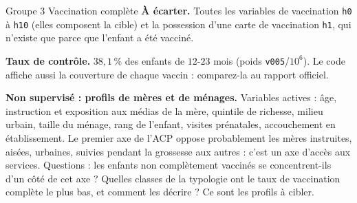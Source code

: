 \documentclass[11pt]{article}
\begin{document}
\begin{fiche}{Groupe 3 \textendash{} Vaccination complète}
\textbf{À écarter.} Toutes les variables de vaccination \texttt{h0} à \texttt{h10} (elles composent la cible) et la possession d'une carte de vaccination \texttt{h1}, qui n'existe que parce que l'enfant a été vacciné.

\textbf{Taux de contrôle.} $38{,}1\,\%$ des enfants de $12$-$23$ mois (poids \texttt{v005}/$10^6$). Le code affiche aussi la couverture de chaque vaccin : comparez-la au rapport officiel.

\textbf{Non supervisé : profils de mères et de ménages.} Variables actives : âge, instruction et exposition aux médias de la mère, quintile de richesse, milieu urbain, taille du ménage, rang de l'enfant, visites prénatales, accouchement en établissement. Le premier axe de l'ACP oppose probablement les mères instruites, aisées, urbaines, suivies pendant la grossesse aux autres : c'est un axe d'accès aux services. Questions : les enfants non complètement vaccinés se concentrent-ils d'un côté de cet axe ? Quelles classes de la typologie ont le taux de vaccination complète le plus bas, et comment les décrire ? Ce sont les profils à cibler.
\end{fiche}

\end{document}
